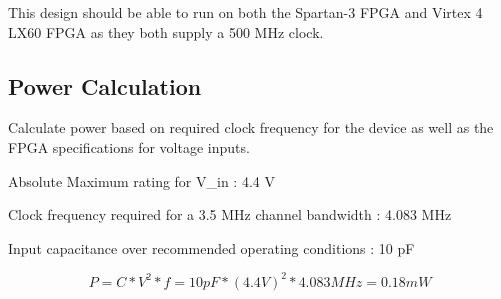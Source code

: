 \documentclass[10pt]{article}
\begin{document}
  This design should be able to run on both the Spartan-3 FPGA and Virtex 4 LX60
  FPGA as they both supply a 500 MHz clock.
  
  \subsection{Power Calculation}
  
  Calculate power based on required clock frequency for the device as well as the
  FPGA specifications for voltage inputs.
  
  Absolute Maximum rating for V_{in} : 4.4 V
  
  Clock frequency required for a 3.5 MHz channel bandwidth : 4.083 MHz
  
  Input capacitance over recommended operating conditions : 10 pF
  \begin{center}
  \begin{equation}
  P =C * V^2 * f = 10 pF * (4.4 V)^2 * 4.083 MHz = 0.18 mW
  \end{equation}
  \end{center}
  
\end{document}
